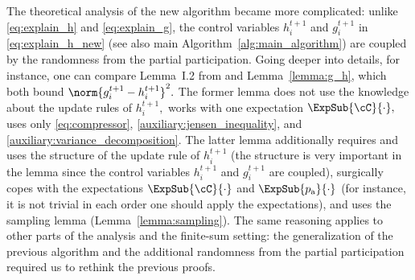 \documentclass{article}
\newcommand{\algorithmname}{DASHA-PP}
\newcommand*{\probavailable}{\ensuremath{p_{\textnormal{a}}}}
\begin{document}
The theoretical analysis of the new algorithm became more complicated: unlike \eqref{eq:explain_h} and \eqref{eq:explain_g}, the control variables $h^{t+1}_i$ and $g^{t+1}_i$ in \eqref{eq:explain_h_new} (see also main Algorithm~\ref{alg:main_algorithm}) are coupled by the randomness from the partial participation. 
Going deeper into details, for instance, one can compare Lemma~I.2 from \citep{tyurin2022dasha} and Lemma~\ref{lemma:g_h}, which both bound $\norm{g^{t+1}_i - h^{t+1}_i}^2.$ The former lemma does not use the knowledge about the update rules of $h^{t+1}_i,$ works with one expectation $\ExpSub{\cC}{\cdot},$ uses only \eqref{eq:compressor}, \eqref{auxiliary:jensen_inequality}, and \eqref{auxiliary:variance_decomposition}. The latter lemma additionally requires and uses the structure of the update rule of $h^{t+1}_i$ 
(the structure is very important in the lemma since the control variables $h^{t+1}_i$ and $g^{t+1}_i$ are coupled), 
surgically copes with the expectations $\ExpSub{\cC}{\cdot}$ and $\ExpSub{\probavailable}{\cdot}$ (for instance, it is not trivial in each order one should apply the expectations), and uses the sampling lemma (Lemma~\ref{lemma:sampling}). The same reasoning applies to other parts of the analysis and the finite-sum setting: the generalization of the previous algorithm and the additional randomness from the partial participation required us to rethink the previous proofs.

\end{document}
